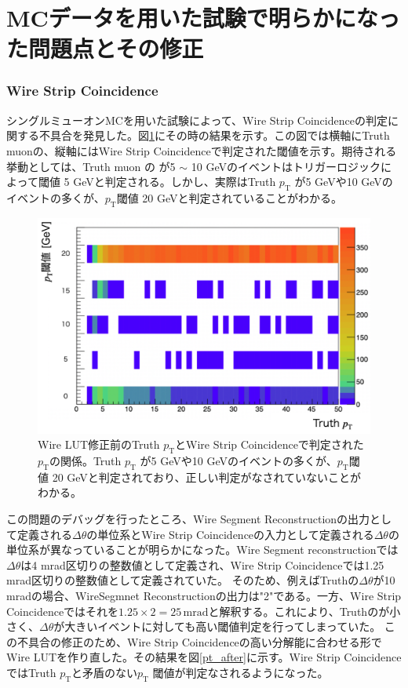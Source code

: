 \clearpage
\section{MCデータを用いた試験で明らかになった問題点とその修正}
\label{sec:appendix:MC-test}
\subsubsection{Wire Strip Coincidence}
シングルミューオンMCを用いた試験によって、Wire Strip Coincidenceの\pt 判定に関する不具合を発見した。図\ref{pt_before}にその時の結果を示す。この図では横軸にTruth muonの\pt、縦軸にはWire Strip Coincidenceで判定された\pt 閾値を示す。期待される挙動としては、Truth muon の \pt が5 $\sim$ 10 GeVのイベントはトリガーロジックによって\pt 閾値 5 GeVと判定される。しかし、実際はTruth $p_\mathrm{T}$ が5 GeVや10 GeVのイベントの多くが、$p_\mathrm{T}$閾値 20 GeVと判定されていることがわかる。

\begin{figure} 
\centering
\includegraphics[width=16cm]{fig/Test/pt_before.png}
\caption[]{Wire LUT修正前のTruth $p_\mathrm{T}$とWire Strip Coincidenceで判定された$p_\mathrm{T}$の関係。Truth $p_\mathrm{T}$ が5 GeVや10 GeVのイベントの多くが、$p_\mathrm{T}$閾値 20 GeVと判定されており、正しい\pt 判定がなされていないことがわかる。}
\label{pt_before}
\end{figure}

この問題のデバッグを行ったところ、Wire Segment Reconstructionの出力として定義される$\Delta\theta$の単位系とWire Strip Coincidenceの入力として定義される$\Delta\theta$の単位系が異なっていることが明らかになった。Wire Segment reconstructionでは$\Delta\theta$は4 mrad区切りの整数値として定義され、Wire Strip Coincidenceでは1.25 mrad区切りの整数値として定義されていた。
そのため、例えばTruthの$\Delta\theta$が10 mradの場合、WireSegmnet Reconstructionの出力は"2"である。一方、Wire Strip Coincidenceではそれを$1.25 \times 2 = 25\,\mathrm{mrad}$と解釈する。これにより、Truthの\pt が小さく、$\Delta\theta$が大きいイベントに対しても高い\pt 閾値判定を行ってしまっていた。
この不具合の修正のため、Wire Strip Coincidenceの高い分解能に合わせる形でWire LUTを作り直した。その結果を図\ref{pt_after}に示す。Wire Strip CoincidenceではTruth $p_\mathrm{T}$と矛盾のない$p_\mathrm{T}$ 閾値が判定なされるようになった。
 
